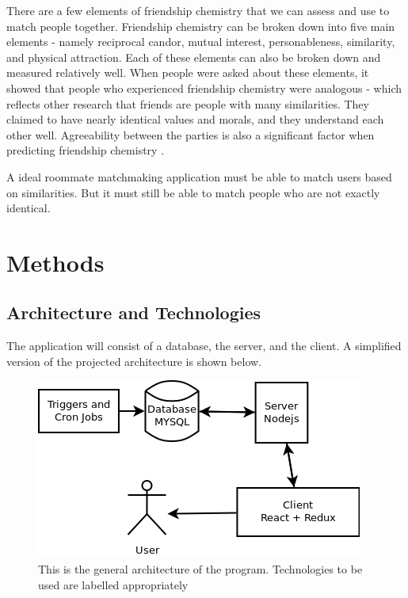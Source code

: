 \documentclass[journal]{./IEEE/IEEEtran}
\begin{document}
There are a few elements of friendship chemistry that we can assess and use to match people together. Friendship chemistry can be broken down into five main elements - namely reciprocal candor, mutual interest, personableness, similarity, and physical attraction\cite{f_chemistry}. Each of these elements can also be broken down and measured relatively well. When people were asked about these elements, it showed that people who experienced friendship chemistry were analogous\cite{f_chemistry} - which reflects other research that friends are people with many similarities\cite{similar}. They claimed to have nearly identical values and morals, and they understand each other well\cite{f_chemistry}. Agreeability between the parties is also a significant factor when predicting friendship chemistry \cite{f_chemistry}.

A ideal roommate matchmaking application must be able to match users based on similarities. But it must still be able to match people who are not exactly identical.

\section{Methods}

\subsection{Architecture and Technologies}
The application will consist of a database, the server, and the client. A simplified version of the projected architecture is shown below.
\\
\begin{figure}[h]
\centering
\includegraphics[scale=0.5]{Architecture}
\caption{This is the general architecture of the program. Technologies to be used are labelled appropriately}
\end{figure}
\end{document}
